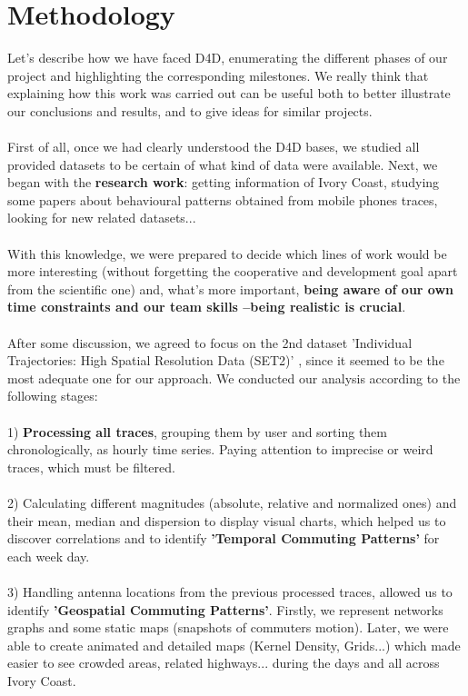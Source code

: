 \newpage

\section{Methodology}

Let's describe how we have faced D4D, enumerating the different phases of our project and highlighting the corresponding milestones. We really think that explaining how this work was carried out can be useful both to better illustrate our conclusions and results, and to give ideas for similar projects.
\\
\\
First of all, once we had clearly understood the D4D bases, we studied all provided datasets to be certain of what kind of data were available. Next, we began with the {\bf research work}: getting information of Ivory Coast, studying some papers about behavioural patterns obtained from mobile phones traces, looking for new related datasets...
\\
\\
With this knowledge, we were prepared to decide which lines of work would be more interesting (without forgetting the cooperative and development goal apart from the scientific one) and, what's more important, {\bf being aware of our own time constraints and our team skills --being realistic is crucial}.
\\
\\
After some discussion, we agreed to focus on the 2nd dataset 'Individual Trajectories: High Spatial Resolution Data (SET2)' \citep{DBLP:journals/corr/abs-1210-0137} , since it seemed to be the most adequate one for our approach. We conducted our analysis according to the following stages:
\\
\\
1) {\bf Processing all traces}, grouping them by user and sorting them chronologically, as hourly time series. Paying attention to imprecise or weird traces, which must be filtered.
\\
\\
2) Calculating different magnitudes (absolute, relative and normalized ones) and their mean, median and dispersion to display visual charts, which helped us to discover correlations and to identify {\bf 'Temporal Commuting Patterns'} for each week day.
\\
\\
3) Handling antenna locations from the previous processed traces, allowed us to identify {\bf 'Geospatial Commuting Patterns'}. Firstly, we represent networks graphs and some static maps (snapshots of commuters motion). Later, we were able to create animated and detailed maps (Kernel Density, Grids...) which made easier to see crowded areas, related highways... during the days and all across Ivory Coast.
